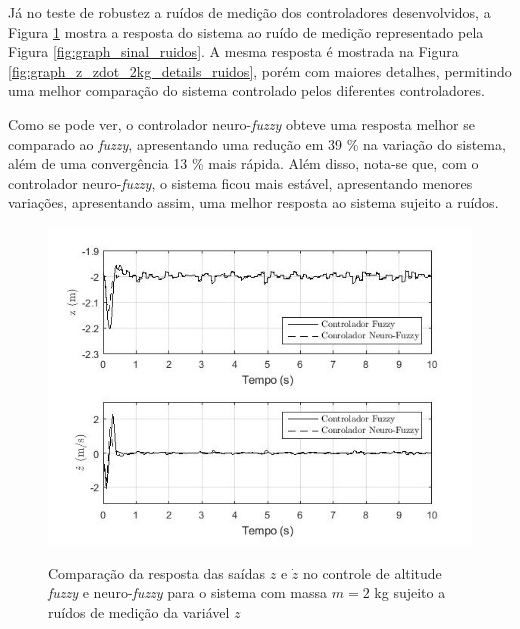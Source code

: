 Já no teste de robustez a ruídos de medição dos controladores desenvolvidos, a Figura \ref{fig:graph_z_zdot_2kg_ruidos} mostra a resposta do sistema ao ruído de medição representado pela Figura \ref{fig:graph_sinal_ruidos}. A mesma resposta é mostrada na Figura \ref{fig:graph_z_zdot_2kg_details_ruidos}, porém com maiores detalhes, permitindo uma melhor comparação do sistema controlado pelos diferentes controladores.

Como se pode ver, o controlador neuro-\textit{fuzzy} obteve uma resposta melhor se comparado ao \textit{fuzzy}, apresentando uma redução em 39 \% na variação do sistema, além de uma convergência 13 \% mais rápida. Além disso, nota-se que, com o controlador neuro-\textit{fuzzy}, o sistema ficou mais estável, apresentando menores variações, apresentando assim, uma melhor resposta ao sistema sujeito a ruídos.

\begin{figure}[!htb]
    \centering
    \caption{Comparação da resposta das saídas $z$ e $\dot{z}$ no controle de altitude \textit{fuzzy} e neuro-\textit{fuzzy} para o sistema com massa $m=2$ kg sujeito a ruídos de medição da variável $z$}
    \includegraphics[width=1\textwidth]{./04-figuras/figuras_pos_banca/7-altitude2kg_ruido/graph_z_zdot_2kg_ruidos}
    \label{fig:graph_z_zdot_2kg_ruidos}
\end{figure}

